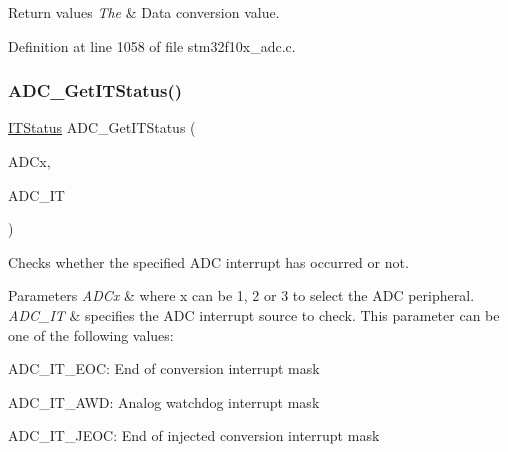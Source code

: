 \begin{DoxyRetVals}{Return values}
{\em The} & Data conversion value. \\
\hline
\end{DoxyRetVals}


Definition at line 1058 of file stm32f10x\+\_\+adc.\+c.

\mbox{\label{group___a_d_c___exported___functions_gaa1d3b910a83dbf14d4f68c8eef058612}} 
\subsubsection{\texorpdfstring{A\+D\+C\+\_\+\+Get\+I\+T\+Status()}{ADC\_GetITStatus()}}
{\footnotesize\ttfamily \hyperlink{group___exported__types_gaacbd7ed539db0aacd973a0f6eca34074}{I\+T\+Status} A\+D\+C\+\_\+\+Get\+I\+T\+Status (\begin{DoxyParamCaption}\item[{\hyperlink{struct_a_d_c___type_def}{A\+D\+C\+\_\+\+Type\+Def} $\ast$}]{A\+D\+Cx,  }\item[{uint16\+\_\+t}]{A\+D\+C\+\_\+\+IT }\end{DoxyParamCaption})}



Checks whether the specified A\+DC interrupt has occurred or not. 


\begin{DoxyParams}{Parameters}
{\em A\+D\+Cx} & where x can be 1, 2 or 3 to select the A\+DC peripheral. \\
\hline
{\em A\+D\+C\+\_\+\+IT} & specifies the A\+DC interrupt source to check. This parameter can be one of the following values\+: \begin{DoxyItemize}
\item A\+D\+C\+\_\+\+I\+T\+\_\+\+E\+OC\+: End of conversion interrupt mask \item A\+D\+C\+\_\+\+I\+T\+\_\+\+A\+WD\+: Analog watchdog interrupt mask \item A\+D\+C\+\_\+\+I\+T\+\_\+\+J\+E\+OC\+: End of injected conversion interrupt mask \end{DoxyItemize}
\\
\hline
\end{DoxyParams}

